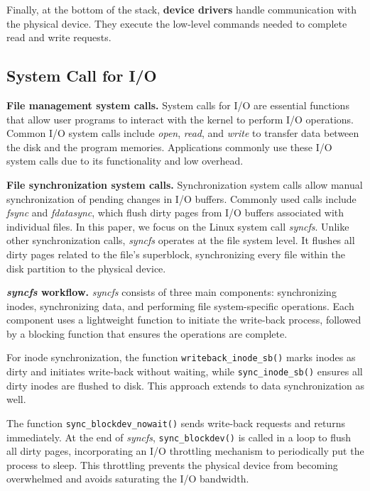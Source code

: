 Finally, at the bottom of the stack, \textbf{device drivers} handle communication with the physical device. They execute the low-level commands needed to complete read and write requests. 




\subsection{System Call for I/O}

\label{subsec:System_call}
\textbf{File management system calls.} System calls for I/O are essential functions that allow user programs to interact with the kernel to perform I/O operations. Common I/O system calls include \textit{open}, \textit{read}, and \textit{write} to transfer data between the disk and the program memories. Applications commonly use these I/O system calls due to its functionality and low overhead.

\textbf{File synchronization system calls.} Synchronization system calls allow manual synchronization of pending changes in I/O buffers. Commonly used calls include \textit{fsync} and \textit{fdatasync}, which flush dirty pages from I/O buffers associated with individual files. In this paper, we focus on the Linux system call \textit{syncfs}. Unlike other synchronization calls, \textit{syncfs} operates at the file system level. It flushes all dirty pages related to the file's superblock, synchronizing every file within the disk partition to the physical device.

\textbf{\textit{syncfs} workflow.} \textit{syncfs} consists of three main components: synchronizing inodes, synchronizing data, and performing file system-specific operations. Each component uses a lightweight function to initiate the write-back process, followed by a blocking function that ensures the operations are complete. 



For inode synchronization, the function \texttt{writeback\_inode\_sb()} marks inodes as dirty and initiates write-back without waiting, while \texttt{sync\_inode\_sb()} ensures all dirty inodes are flushed to disk. This approach extends to data synchronization as well.

The function \texttt{sync\_blockdev\_nowait()} sends write-back requests and returns immediately. At the end of \textit{syncfs}, \texttt{sync\_blockdev()} is called in a loop to flush all dirty pages, incorporating an I/O throttling mechanism to periodically put the process to sleep. This throttling prevents the physical device from becoming overwhelmed and avoids saturating the I/O bandwidth. 

